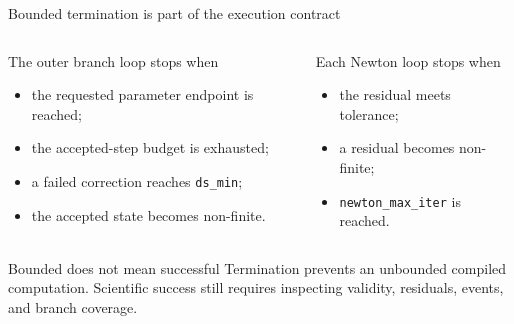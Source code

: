 \begin{frame}{Bounded termination is part of the execution contract}
\begin{columns}[T]
\begin{block}{The outer branch loop stops when}
\begin{itemize}
  \item the requested parameter endpoint is reached;
  \item the accepted-step budget is exhausted;
  \item a failed correction reaches \texttt{ds\_min};
  \item the accepted state becomes non-finite.
\end{itemize}
\end{block}
\begin{block}{Each Newton loop stops when}
\begin{itemize}
  \item the residual meets tolerance;
  \item a residual becomes non-finite;
  \item \texttt{newton\_max\_iter} is reached.
\end{itemize}
\end{block}
\end{columns}
\vspace{4mm}
\begin{alertblock}{Bounded does not mean successful}
Termination prevents an unbounded compiled computation. Scientific success
still requires inspecting validity, residuals, events, and branch coverage.
\end{alertblock}
\end{frame}

